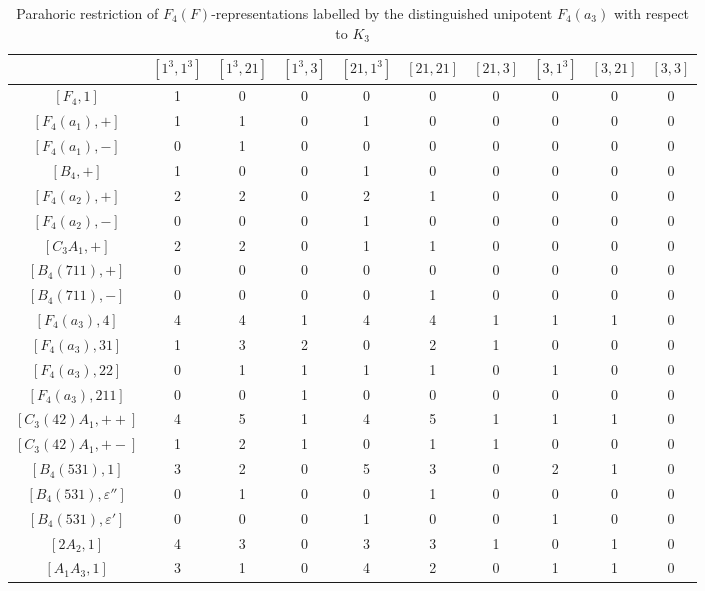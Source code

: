 \begin{landscape}
\begin{table}[!ht]
        {\small
        \begin{tabular}{|c|ccccccccc|}
            \hline
        & $[1^3,1^3]$ & $[1^3,21]$ & $[1^3,3]$ & $[21,1^3]$ & $[21,21]$ & $[21,3]$ & $[3,1^3]$ & $[3,21]$ & $[3,3]$ \\\hline
        $[F_4,1]$ & 1 & 0 & 0 & 0 & 0 & 0 & 0 & 0 & 0 \\\hline
        $[F_4(a_1),+]$ & 1 & 1 & 0 & 1 & 0 & 0 & 0 & 0 & 0 \\
        $[F_4(a_1),-]$ & 0 & 1 & 0 & 0 & 0 & 0 & 0 & 0 & 0 \\
        $[B_4,+]$ & 1 & 0 & 0 & 1 & 0 & 0 & 0 & 0 & 0 \\\hline
        $[F_4(a_2),+]$ & 2 & 2 & 0 & 2 & 1 & 0 & 0 & 0 & 0 \\
        $[F_4(a_2),-]$ & 0 & 0 & 0 & 1 & 0 & 0 & 0 & 0 & 0 \\
        $[C_3A_1,+]$ & 2 & 2 & 0 & 1 & 1 & 0 & 0 & 0 & 0 \\\hline
        $[B_4(711),+]$ & 0 & 0 & 0 & 0 & 0 & 0 & 0 & 0 & 0 \\
        $[B_4(711),-]$ & 0 & 0 & 0 & 0 & 1 & 0 & 0 & 0 & 0 \\\hline
        $[F_4(a_3),4]$ & 4 & 4 & 1 & 4 & 4 & 1 & 1 & 1 & 0 \\
        $[F_4(a_3),31]$ & 1 & 3 & 2 & 0 & 2 & 1 & 0 & 0 & 0 \\
        $[F_4(a_3),22]$ & 0 & 1 & 1 & 1 & 1 & 0 & 1 & 0 & 0 \\
        $[F_4(a_3),211]$ & 0 & 0 & 1 & 0 & 0 & 0 & 0 & 0 & 0 \\
        $[C_3(42)A_1,++]$ & 4 & 5 & 1 & 4 & 5 & 1 & 1 & 1 & 0 \\
        $[C_3(42)A_1,+-]$ & 1 & 2 & 1 & 0 & 1 & 1 & 0 & 0 & 0 \\
        $[B_4(531),1]$ & 3 & 2 & 0 & 5 & 3 & 0 & 2 & 1 & 0 \\
        $[B_4(531),\varepsilon'']$ & 0 & 1 & 0 & 0 & 1 & 0 & 0 & 0 & 0 \\
        $[B_4(531),\varepsilon']$ & 0 & 0 & 0 & 1 & 0 & 0 & 1 & 0 & 0 \\
        $[2A_2,1]$ & {4} & {3} & 0 & {3} & {3} & 1 & 0 & 1 & 0 \\
        $[A_1A_3,1]$ & 3 & 1 & 0 & 4 & 2 & 0 & 1 & 1 & 0 \\\hline
        \end{tabular}
        }
        \caption{Parahoric restriction of $F_4(F)$-representations labelled by the distinguished unipotent $F_4(a_3)$ with respect to $K_3$}
    \end{table}

\end{landscape}
